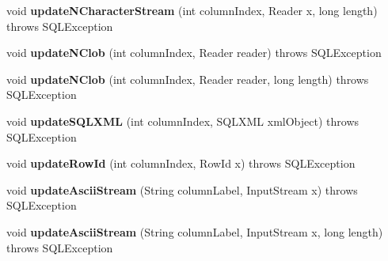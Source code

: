 \begin{DoxyCompactItemize}
\mbox{\label{classcom_1_1mysql_1_1jdbc_1_1_j_d_b_c4_updatable_result_set_a2b6028e8e2389e50e345a00a374c5615}} 
void {\bfseries update\+N\+Character\+Stream} (int column\+Index, Reader x, long length)  throws S\+Q\+L\+Exception 
\item 
\mbox{\label{classcom_1_1mysql_1_1jdbc_1_1_j_d_b_c4_updatable_result_set_ad7b241d88cd0e3c06a6f9b22a5ebece7}} 
void {\bfseries update\+N\+Clob} (int column\+Index, Reader reader)  throws S\+Q\+L\+Exception 
\item 
\mbox{\label{classcom_1_1mysql_1_1jdbc_1_1_j_d_b_c4_updatable_result_set_a95f8d08bbda0b2235c90f9b5ad2cac71}} 
void {\bfseries update\+N\+Clob} (int column\+Index, Reader reader, long length)  throws S\+Q\+L\+Exception 
\item 
\mbox{\label{classcom_1_1mysql_1_1jdbc_1_1_j_d_b_c4_updatable_result_set_a45490658007cb046290fe14e5faafd59}} 
void {\bfseries update\+S\+Q\+L\+X\+ML} (int column\+Index, S\+Q\+L\+X\+ML xml\+Object)  throws S\+Q\+L\+Exception 
\item 
\mbox{\label{classcom_1_1mysql_1_1jdbc_1_1_j_d_b_c4_updatable_result_set_a507daf3af9acd5f323ac91a8fa55bd14}} 
void {\bfseries update\+Row\+Id} (int column\+Index, Row\+Id x)  throws S\+Q\+L\+Exception 
\item 
\mbox{\label{classcom_1_1mysql_1_1jdbc_1_1_j_d_b_c4_updatable_result_set_a211e74901c429cba84dad6d96066f19d}} 
void {\bfseries update\+Ascii\+Stream} (String column\+Label, Input\+Stream x)  throws S\+Q\+L\+Exception 
\item 
\mbox{\label{classcom_1_1mysql_1_1jdbc_1_1_j_d_b_c4_updatable_result_set_a6cead6651f3e9771c59a1313859e8cbf}} 
void {\bfseries update\+Ascii\+Stream} (String column\+Label, Input\+Stream x, long length)  throws S\+Q\+L\+Exception 
\item 

\end{DoxyCompactItemize}
